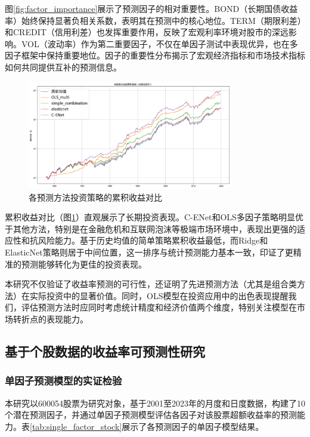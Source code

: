 \documentclass[12pt, a4paper]{article}
\begin{document}
图\ref{fig:factor_importance}展示了预测因子的相对重要性。BOND（长期国债收益率）始终保持显著负相关系数，表明其在预测中的核心地位。TERM（期限利差）和CREDIT（信用利差）也发挥重要作用，反映了宏观利率环境对股市的深远影响。VOL（波动率）作为第二重要因子，不仅在单因子测试中表现优异，也在多因子框架中保持重要地位。因子的重要性分布揭示了宏观经济指标和市场技术指标如何共同提供互补的预测信息。

\begin{figure}[htbp]
\centering
\includegraphics[width=0.8\textwidth]{./img/累积收益对比.png}
\caption{各预测方法投资策略的累积收益对比}
\label{fig:cumulative_return}
\end{figure}

累积收益对比（图\ref{fig:cumulative_return}）直观展示了长期投资表现。C-ENet和OLS多因子策略明显优于其他方法，特别是在金融危机和互联网泡沫等极端市场环境中，表现出更强的适应性和抗风险能力。基于历史均值的简单策略累积收益最低，而Ridge和ElasticNet策略则居于中间位置，这一排序与统计预测能力基本一致，印证了更精准的预测能够转化为更佳的投资表现。

本研究不仅验证了收益率预测的可行性，还证明了先进预测方法（尤其是组合类方法）在实际投资中的显著价值。同时，OLS模型在投资应用中的出色表现提醒我们，评估预测方法时应同时考虑统计精度和经济价值两个维度，特别关注模型在市场转折点的表现能力。

\subsection{基于个股数据的收益率可预测性研究}

\subsubsection{单因子预测模型的实证检验}

本研究以600054股票为研究对象，基于2001至2023年的月度和日度数据，构建了10个潜在预测因子，并通过单因子预测模型评估各因子对该股票超额收益率的预测能力。表\ref{tab:single_factor_stock}展示了各预测因子的单因子模型结果。
\end{document}
